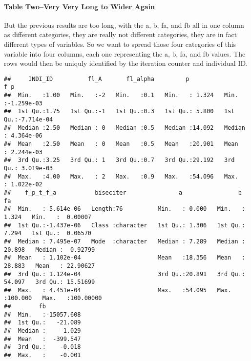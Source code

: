 \documentclass[
]{book}
\newenvironment{Shaded}{\begin{snugshade}}{\end{snugshade}}
\newcommand{\CommentTok}[1]{\textcolor[rgb]{0.56,0.35,0.01}{\textit{#1}}}
\newcommand{\DataTypeTok}[1]{\textcolor[rgb]{0.13,0.29,0.53}{#1}}
\newcommand{\KeywordTok}[1]{\textcolor[rgb]{0.13,0.29,0.53}{\textbf{#1}}}
\newcommand{\NormalTok}[1]{#1}
\newcommand{\OperatorTok}[1]{\textcolor[rgb]{0.81,0.36,0.00}{\textbf{#1}}}
\newcommand{\StringTok}[1]{\textcolor[rgb]{0.31,0.60,0.02}{#1}}
\begin{document}
\hypertarget{table-twovery-very-long-to-wider-again}{%
\paragraph{Table Two--Very Very Long to Wider Again}\label{table-twovery-very-long-to-wider-again}}

But the previous results are too long, with the a, b, fa, and fb all in one column as different categories, they are really not different categories, they are in fact different types of variables. So we want to spread those four categories of this variable into four columns, each one representing the a, b, fa, and fb values. The rows would then be uniquly identified by the iteration counter and individual ID.

\begin{Shaded}
\end{Shaded}

\begin{verbatim}
##     INDI_ID          fl_A       fl_alpha         p               f_p            
##  Min.   :1.00   Min.   :-2   Min.   :0.1   Min.   : 1.324   Min.   :-1.259e-03  
##  1st Qu.:1.75   1st Qu.:-1   1st Qu.:0.3   1st Qu.: 5.800   1st Qu.:-7.714e-04  
##  Median :2.50   Median : 0   Median :0.5   Median :14.092   Median : 4.364e-06  
##  Mean   :2.50   Mean   : 0   Mean   :0.5   Mean   :20.901   Mean   : 2.244e-03  
##  3rd Qu.:3.25   3rd Qu.: 1   3rd Qu.:0.7   3rd Qu.:29.192   3rd Qu.: 3.019e-03  
##  Max.   :4.00   Max.   : 2   Max.   :0.9   Max.   :54.096   Max.   : 1.022e-02  
##    f_p_t_f_a           biseciter               a                b                 fa           
##  Min.   :-5.614e-06   Length:76          Min.   : 0.000   Min.   :  1.324   Min.   :  0.00007  
##  1st Qu.:-1.437e-06   Class :character   1st Qu.: 1.306   1st Qu.:  7.294   1st Qu.:  0.06570  
##  Median : 7.495e-07   Mode  :character   Median : 7.289   Median : 20.898   Median :  0.92799  
##  Mean   : 1.102e-04                      Mean   :18.356   Mean   : 28.883   Mean   : 22.90627  
##  3rd Qu.: 1.124e-04                      3rd Qu.:20.891   3rd Qu.: 54.097   3rd Qu.: 15.51699  
##  Max.   : 4.451e-04                      Max.   :54.095   Max.   :100.000   Max.   :100.00000  
##        fb            
##  Min.   :-15057.608  
##  1st Qu.:   -21.089  
##  Median :    -1.029  
##  Mean   :  -399.547  
##  3rd Qu.:    -0.018  
##  Max.   :    -0.001
\end{verbatim}
\end{document}

